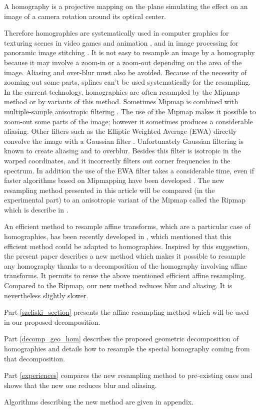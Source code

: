 
A homography is a projective mapping on the plane simulating the effect  on an image of a camera rotation around its optical center. 



Therefore homographies are systematically used in computer graphics for texturing scenes in video games and animation \cite{heckbert1983texture}, and in image  processing for panoramic image stitching \cite{brown2007automatic}. It is not easy to resample an image by a homography because it may involve a zoom-in or a zoom-out depending on the area of the image. Aliasing and over-blur must also be avoided. Because of the necessity of zooming-out some parts, splines can't be used systematically for the resampling. In the current technology, homographies are often resampled by the Mipmap method \cite{williams1983pyramidal} or by variants of this method. Sometimes Mipmap is combined with multiple-sample anisotropic filtering  \cite{barkans1997high}. The use of the Mipmap makes it possible to zoom-out some parts of the image; however it sometimes produces a considerable aliasing. Other filters such as the Elliptic Weighted Average (EWA) directly convolve the image with a Gaussian filter \cite{greene1986creating}. Unfortunately Gaussian filtering is known to create aliasing and to overblur. Besides this filter is isotropic in the warped coordinates, and it incorrectly filters out corner frequencies in the spectrum. In addition the use of the EWA filter takes a considerable time, even if faster algorithms based on Mipmapping have been developed \cite{mccormack1999feline,huttner1999fast}. The new resampling method presented in this article will be compared (in the experimental part) to an anisotropic variant of the Mipmap called the Ripmap which is describe in \cite{akenine2008real}.

	An efficient method to resample affine transforms, which are a particular case of homographies, has been recently developed in \cite{szeliski2010high}, which mentioned that this efficient method could be adapted to homographies. Inspired by this suggestion, the present paper describes a new method which makes it possible to resample any homography thanks to a decomposition of the homography involving affine transforms. It permits to reuse the above mentioned efficient affine resampling. Compared to the Ripmap, our new method reduces blur and aliasing. It is nevertheless slightly slower.
	
	Part \ref{szeliski_section} presents the affine resampling method which will be used in our  proposed decomposition.
		
	Part \ref{decomp_geo_hom} describes the proposed geometric decomposition of homographies and details how to resample the special homography coming from that decomposition.
	
	Part \ref{experiences} compares the new resampling method to pre-existing ones and shows that the new one reduces blur and aliasing.
	
	Algorithms describing the new method are given in appendix.	
